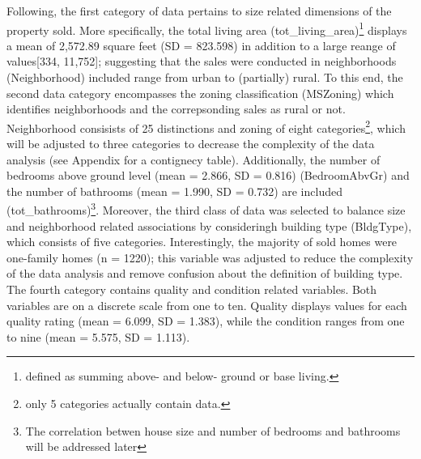 \documentclass{article}
\begin{document}
\indent Following, the first category of data pertains to size related dimensions of the property sold. More specifically, the total living area (tot\_living\_area)\footnote{defined as summing above- and below- ground or base living.} displays a mean of 2,572.89 square feet (SD = 823.598) in addition to a large reange of values[334, 11,752]; suggesting that the sales were conducted in neighborhoods (Neighborhood) included range from urban to (partially) rural. To this end, the second data category encompasses the zoning classification (MSZoning) which identifies neighborhoods and the correpsonding sales as rural or not. Neighborhood consisists of 25 distinctions and zoning of eight categories\footnote{only 5 categories actually contain data.}, which will be adjusted to three categories to decrease the complexity of the data analysis (see Appendix for a contignecy table). Additionally, the number of bedrooms above ground level (mean = 2.866, SD = 0.816) (BedroomAbvGr) and the number of bathrooms (mean = 1.990, SD = 0.732) are included (tot\_bathrooms)\footnote{The correlation betwen house size and number of bedrooms and bathrooms will be addressed later}. 
\indent Moreover, the third class of data was selected to balance size and neighborhood related associations by consideringh building type (BldgType), which consists of five categories. Interestingly, the majority of sold homes were one-family homes (n = 1220); this variable was adjusted to reduce the complexity of the data analysis and remove confusion about the definition of building type.
\indent The fourth category contains quality and condition related variables. Both variables are on a discrete  scale from one to ten. Quality displays values for each quality rating (mean = 6.099, SD = 1.383), while the condition ranges from one to nine (mean = 5.575, SD = 1.113).
 
\end{document}
